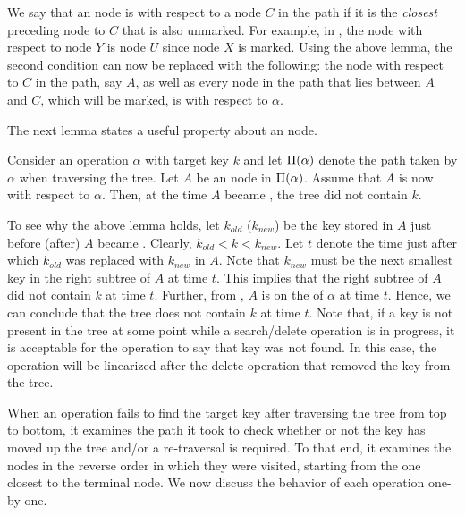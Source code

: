 We say that an \myanchor{} node is \emph{\mycritical{}} with respect to a node $C$ in the path if it is the \emph{closest} preceding \myanchor{} node to $C$ that is also unmarked. For example, in , the \mycritical{} \myanchor{} node with respect to node $Y$ is node $U$ since node $X$ is marked. Using the above lemma, the second condition can now be replaced with the following: the \mycritical{} \myanchor{} node with respect to $C$ in the path, say $A$, as well as every \myanchor{} node in the path that lies between $A$ and $C$, which will be marked, is \myconsistent{} with respect to $\alpha$.

The next lemma states a useful  property about an \myinconsistent{} \myanchor{} node.

\begin{lemma}
\label{lem:inconsistent}
Consider an operation $\alpha$ with target key $k$ and let $\Pi(\alpha)$ denote the path 
taken by $\alpha$ when traversing the tree. Let $A$ be an \myanchor{} node in $\Pi(\alpha)$. Assume that $A$ is now \myinconsistent{} with respect to $\alpha$. Then, at the time $A$ became \myinconsistent{}, the tree did not contain $k$.
\end{lemma}

To see why the above lemma holds, let $k_{old}$ ($k_{new}$) be the key stored in $A$ just before (after) $A$ became \myinconsistent{}. Clearly, $k_{old} < k < k_{new}$. Let $t$ denote the time just after which $k_{old}$ was replaced with $k_{new}$ in $A$. Note that $k_{new}$ must be the next smallest key in the right subtree of $A$ at time $t$. This implies that the right subtree of $A$ did not contain $k$ at time $t$. Further, from , $A$ is on the \accesspath of $\alpha$ at time $t$. Hence, we can conclude that the tree does not contain $k$ at time $t$. Note that, if a key is not present in the tree at some point while a search/delete operation is in progress, it is acceptable for the operation to say that key was not found. In this case, the operation will be linearized after the delete operation that removed the key from the tree.

When an operation fails to find the target key after traversing the tree from top to bottom, it examines the path it took to check whether or not the key has moved up the tree and/or a re-traversal is required. To that end, it examines the \myanchor{} nodes in the reverse order in which they were visited, starting from the one closest to the terminal node. We now discuss the behavior of each operation one-by-one.


